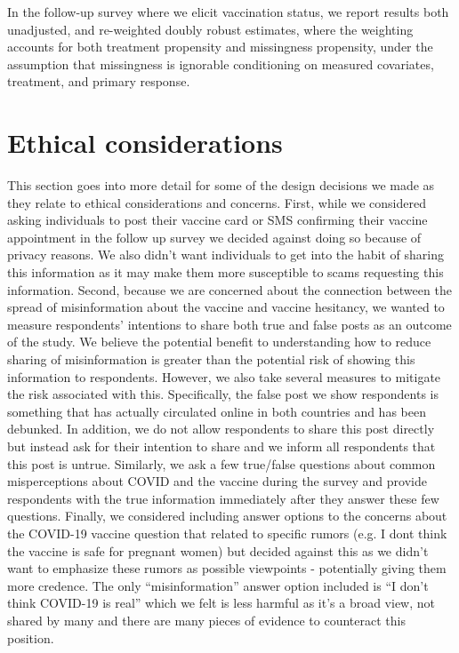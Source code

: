 \documentclass[letterpaper, 12pt, parskip=full,DIV=10]{scrartcl}
\begin{document}
In the follow-up survey where we elicit vaccination status, we report results both unadjusted, and re-weighted doubly robust estimates, where the weighting accounts for both treatment propensity and missingness propensity, under the assumption that missingness is ignorable conditioning on measured covariates, treatment, and primary response.  

\section{Ethical considerations}

This section goes into more detail for some of the design decisions we made as they relate to ethical considerations and concerns. First, while we considered asking individuals to post their vaccine card or SMS confirming their vaccine appointment in the follow up survey we decided against doing so because of privacy reasons. We also didn’t want individuals to get into the habit of sharing this information as it may make them more susceptible to scams requesting this information. Second, because we are concerned about the connection between the spread of misinformation about the vaccine and vaccine hesitancy, we wanted to measure respondents’ intentions to share both true and false posts as an outcome of the study. We believe the potential benefit to understanding how to reduce sharing of misinformation is greater than the potential risk of showing this information to respondents. However, we also take several measures to mitigate the risk associated with this. Specifically, the false post we show respondents is something that has actually circulated online in both countries and has been debunked. In addition, we do not allow respondents to share this post directly but instead ask for their intention to share and we inform all respondents that this post is untrue. Similarly, we ask a few true/false questions about common misperceptions about COVID and the vaccine during the survey and provide respondents with the true information immediately after they answer these few questions. Finally, we considered including answer options to the concerns about the COVID-19 vaccine question that related to specific rumors (e.g. I dont think the vaccine is safe for pregnant women) but decided against this as we didn’t want to emphasize these rumors as possible viewpoints - potentially giving them more credence. The only “misinformation” answer option included is “I don't think COVID-19 is real” which we felt is less harmful as it’s a broad view, not shared by many and there are many pieces of evidence to counteract this position. 

\clearpage


\clearpage
\appendix
\end{document}
